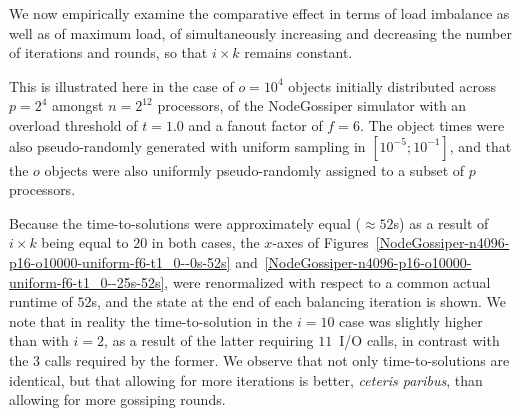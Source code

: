 We now empirically examine the comparative effect in terms of load
imbalance as well as of maximum load, of simultaneously increasing and
decreasing the number of iterations and rounds, so that $i\times{k}$
remains constant.

This is illustrated here in the case of $o=10^4$ objects initially
distributed across $p=2^4$ amongst $n=2^{12}$ processors, of the
\textsf{NodeGossiper} simulator with an overload threshold of $t=1.0$
and a fanout factor of $f=6$.
The object times were also pseudo-randomly generated with uniform
sampling in $[10^{-5};10^{-1}]$, and that the $o$ objects were also
uniformly pseudo-randomly assigned to a subset of $p$ processors.

Because the time-to-solutions were approximately equal ($\approx52$s)
as a result of $i\times{k}$ being equal to $20$ in both cases,
the $x$-axes of
Figures~\ref{NodeGossiper-n4096-p16-o10000-uniform-f6-t1_0--0s-52s}
and~\ref{NodeGossiper-n4096-p16-o10000-uniform-f6-t1_0--25s-52s},
were renormalized with respect to a common actual runtime of $52$s,
and the state at the end of each balancing iteration is shown. We note
that in reality the time-to-solution in the $i=10$ case was slightly
higher than with $i=2$, as a result of the latter requiring $11$~I/O
calls, in contrast with the $3$ calls required by the former.
We observe that not only time-to-solutions are identical, but that
allowing for more iterations is better, \emph{ceteris paribus}, than
allowing for more gossiping rounds.